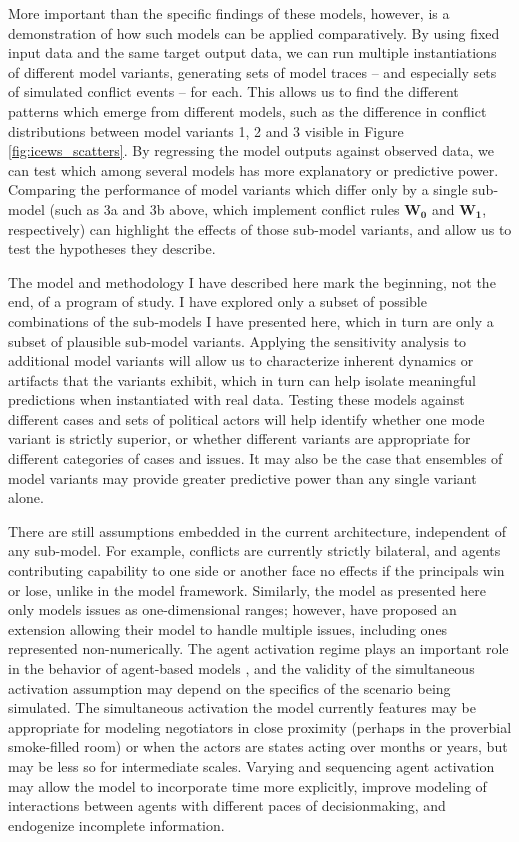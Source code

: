 More important than the specific findings of these models, however, is a demonstration of how such models can be applied comparatively. By using fixed input data and the same target output data, we can run multiple instantiations of different model variants, generating sets of model traces -- and especially sets of simulated conflict events -- for each. This allows us to find the different patterns which emerge from different models, such as the difference in conflict distributions between model variants 1, 2 and 3 visible in Figure \ref{fig:icews_scatters}. By regressing the model outputs against observed data, we can test which among several models has more explanatory or predictive power. Comparing the performance of model variants which differ only by a single sub-model (such as 3a and 3b above, which implement conflict rules $\mathbf{W_0}$ and $\mathbf{W_1}$, respectively) can highlight the effects of those sub-model variants, and allow us to test the hypotheses they describe.

The model and methodology I have described here mark the beginning, not the end, of a program of study. I have explored only a subset of possible combinations of the sub-models I have presented here, which in turn are only a subset of plausible sub-model variants. Applying the sensitivity analysis to additional model variants will allow us to characterize inherent dynamics or artifacts that the variants exhibit, which in turn can help isolate meaningful predictions when instantiated with real data. Testing these models against different cases and sets of political actors will help identify whether one mode variant is strictly superior, or whether different variants are appropriate for different categories of cases and issues. It may also be the case that ensembles of model variants may provide greater predictive power than any single variant alone. 

There are still assumptions embedded in the current architecture, independent of any sub-model. For example, conflicts are currently strictly bilateral, and agents contributing capability to one side or another face no effects if the principals win or lose, unlike in the \citet{wise_2015a} model framework. Similarly, the model as presented here only models issues as one-dimensional ranges; however, \citet{wise_2015b} have proposed an extension allowing their model to handle multiple issues, including ones represented non-numerically. The agent activation regime plays an important role in the behavior of agent-based models \citep{comer_2014}, and the validity of the simultaneous activation assumption may depend on the specifics of the scenario being simulated. The simultaneous activation the model currently features may be appropriate for modeling negotiators in close proximity (perhaps in the proverbial smoke-filled room) or when the actors are states acting over months or years, but may be less so for intermediate scales. Varying and sequencing agent activation may allow the model to incorporate time more explicitly, improve modeling of interactions between agents with different paces of decisionmaking, and endogenize incomplete information. 

